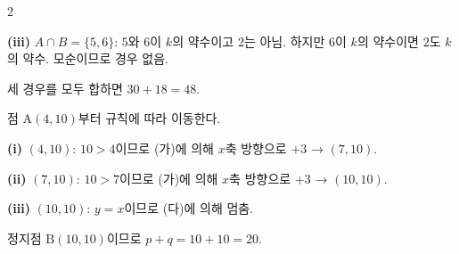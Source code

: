 \documentclass[10pt,fleqn]{article}
\renewcommand{\solpart}[1]{%
  \par\addvspace{10pt}\noindent
  {\sffamily\bfseries\color{black}(#1)}\hspace{3mm}\ignorespaces%
}
\begin{document}
\begin{multicols}{2}
\solpart{iii} $A \cap B = \{5, 6\}$: $5$와 $6$이 $k$의 약수이고 $2$는 아님. 하지만 $6$이 $k$의 약수이면 $2$도 $k$의 약수. 모순이므로 경우 없음.

세 경우를 모두 합하면 $30 + 18 = 48$.


점 $\mathrm{A}(4, 10)$부터 규칙에 따라 이동한다.

\solpart{i} $(4, 10)$: $10 > 4$이므로 (가)에 의해 $x$축 방향으로 $+3$ → $(7, 10)$.

\solpart{ii} $(7, 10)$: $10 > 7$이므로 (가)에 의해 $x$축 방향으로 $+3$ → $(10, 10)$.

\solpart{iii} $(10, 10)$: $y = x$이므로 (다)에 의해 멈춤.

정지점 $\mathrm{B}(10, 10)$이므로 $p + q = 10 + 10 = 20$.

\end{multicols}

\clearpage
\end{document}
